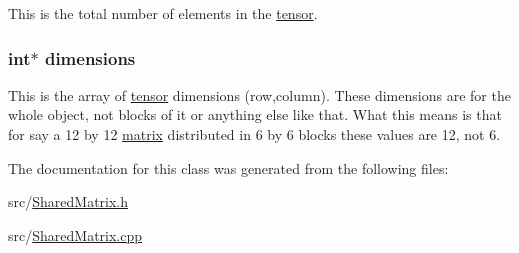This is the total number of elements in the \hyperlink{classJKBuilder_1_1tensor}{tensor}. \hypertarget{classJKBuilder_1_1tensor_a2ce1e6e0782ddee097f2c4aa2663d3e9}{
\subsubsection[{dimensions}]{\setlength{\rightskip}{0pt plus 5cm}int$\ast$ {\bf dimensions}}}
\label{classJKBuilder_1_1tensor_a2ce1e6e0782ddee097f2c4aa2663d3e9}


This is the array of \hyperlink{classJKBuilder_1_1tensor}{tensor} dimensions (row,column). These dimensions are for the whole object, not blocks of it or anything else like that. What this means is that for say a 12 by 12 \hyperlink{classJKBuilder_1_1matrix}{matrix} distributed in 6 by 6 blocks these values are 12, not 6. 

The documentation for this class was generated from the following files:\begin{DoxyCompactItemize}
\item 
src/\hyperlink{SharedMatrix_8h}{SharedMatrix.h}\item 
src/\hyperlink{SharedMatrix_8cpp}{SharedMatrix.cpp}\end{DoxyCompactItemize}
